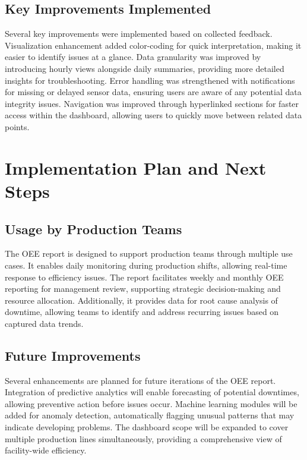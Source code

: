 \documentclass[a4paper,12pt]{article}
\begin{document}
\subsection{Key Improvements Implemented}

Several key improvements were implemented based on collected feedback. Visualization enhancement added color-coding for quick interpretation, making it easier to identify issues at a glance. Data granularity was improved by introducing hourly views alongside daily summaries, providing more detailed insights for troubleshooting. Error handling was strengthened with notifications for missing or delayed sensor data, ensuring users are aware of any potential data integrity issues. Navigation was improved through hyperlinked sections for faster access within the dashboard, allowing users to quickly move between related data points.

\section{Implementation Plan and Next Steps}

\subsection{Usage by Production Teams}

The OEE report is designed to support production teams through multiple use cases. It enables daily monitoring during production shifts, allowing real-time response to efficiency issues. The report facilitates weekly and monthly OEE reporting for management review, supporting strategic decision-making and resource allocation. Additionally, it provides data for root cause analysis of downtime, allowing teams to identify and address recurring issues based on captured data trends.

\subsection{Future Improvements}

Several enhancements are planned for future iterations of the OEE report. Integration of predictive analytics will enable forecasting of potential downtimes, allowing preventive action before issues occur. Machine learning modules will be added for anomaly detection, automatically flagging unusual patterns that may indicate developing problems. The dashboard scope will be expanded to cover multiple production lines simultaneously, providing a comprehensive view of facility-wide efficiency.
\end{document}
